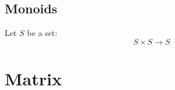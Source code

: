 \documentclass{blog}
\begin{document}
\subsection{Monoids}
\begin{definition}
    Let $S$ be a set:
    \begin{equation}
        \label{eq:composition}
        S \times S \to S
    \end{equation}
\end{definition}

\begin{definition}[monoid]
\end{definition}

\section{Matrix}

\printbibliography
\end{document}
